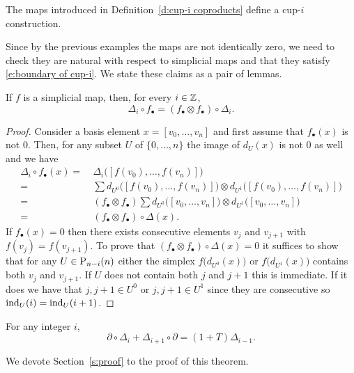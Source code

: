 \begin{theorem}
	The maps introduced in Definition~\ref{d:cup-i coproducts} define a cup-$i$ construction.
\end{theorem}

Since by the previous examples the maps are not identically zero, we need to check they are natural with respect to simplicial maps and that they satisfy \eqref{e:boundary of cup-i}.
We state these claims as a pair of lemmas.

\begin{lemma}
	If $f$ is a simplicial map, then, for every $i \in \Z$,
	\begin{equation*}
	\Delta_i \circ f_\bullet = (f_\bullet \otimes f_\bullet) \circ \Delta_i.
	\end{equation*}
\end{lemma}

\begin{proof}
	Consider a basis element $x = [v_0, \dots, v_n]$ and first assume that $f_\bullet(x)$ is not $0$.
	Then, for any subset $U$ of $\{0, \dots, n\}$ the image of $d_U(x)$ is not $0$ as well and we have
	\begin{align*}
	\Delta_i \circ f_\bullet(x) =\ &
	\Delta_i \big([f(v_0), \dots, f(v_n)]\big) \\ =\ &
	\sum d_{U^0} \big([f(v_0), \dots, f(v_n)]\big) \otimes d_{U^1} \big([f(v_0), \dots, f(v_n)]\big) \\ =\ &
	(f_\bullet \otimes f_\bullet) \sum d_{U^0} \big([v_0, \dots, v_n]\big) \otimes d_{U^1} \big([v_0, \dots, v_n]\big) \\ =\ &
	(f_\bullet \otimes f_\bullet) \circ \Delta(x).
	\end{align*}
	If $f_\bullet(x) = 0$ then there exists consecutive elements $v_j$ and $v_{j+1}$ with $f(v_j) = f(v_{j+1})$.
	To prove that $(f_\bullet \otimes f_\bullet) \circ \Delta(x) = 0$ it suffices to show that for any $U \in \P_{n-i}(n)$ either the simplex $f \big(d_{U^0}(x) \big)$ or $f \big( d_{U^1}(x) \big)$ contains both $v_j$ and $v_{j+1}$.
	If $U$ does not contain both $j$ and $j+1$ this is immediate.
	If it does we have that	$j, j+1 \in U^0$ or $j, j+1 \in U^1$ since they are consecutive so $\ind_U(i) = \ind_U(i+1)$.
\end{proof}

\begin{lemma} \label{l:main}
	For any integer $i$,
	\begin{equation} \label{eq: cup-i coproducts boundary relation}
	\partial \circ \Delta_{i} + \Delta_{i+1} \circ \partial = (1 +T ) \Delta_{i-1}.
	\end{equation}
\end{lemma}

We devote Section~\ref{s:proof} to the proof of this theorem.